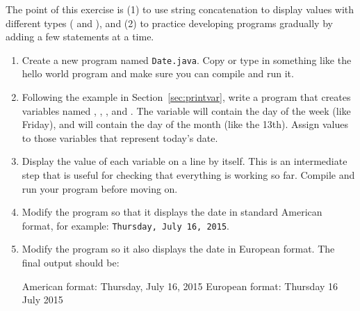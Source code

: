 \begin{exercise}  %
\label{ex:date}

The point of this exercise is (1) to use string concatenation to display values with different types ( and ), and (2) to practice developing programs gradually by adding a few statements at a time.

\begin{enumerate}

\item Create a new program named {\tt Date.java}.
Copy or type in something like the hello world program and make sure you can compile and run it.

\item Following the example in Section~\ref{sec:printvar}, write a program that creates variables named , , , and .
The variable  will contain the day of the week (like Friday), and  will contain the day of the month (like the 13th).
Assign values to those variables that represent today's date.

\item Display the value of each variable on a line by itself.
This is an intermediate step that is useful for checking that everything is working so far.
Compile and run your program before moving on.

\item Modify the program so that it displays the date in standard American format, for example: {\tt Thursday, July 16, 2015}.

\item Modify the program so it also displays the date in European format.
The final output should be:

\begin{stdout}
American format:
Thursday, July 16, 2015
European format:
Thursday 16 July 2015
\end{stdout}

\end{enumerate}

\end{exercise}


